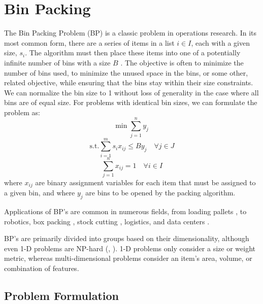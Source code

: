 \documentclass[12pt]{article}
\begin{document}
\section{Bin Packing}

The Bin Packing Problem (BP) is a classic problem in operations research. 
In its most common form, there are a series of items in a list $i \in I$, each with a given size, $s_i$.
The algorithm must then place these items into one of a potentially infinite number of bins with a size $B$ \citep{Coffman2013}. 
The objective is often to minimize the number of bins used, to minimize the unused space in the bins, or some other, related objective, while ensuring that the bins stay within their size constraints.
We can normalize the bin size to 1 without loss of generality in the case where all bins are of equal size.
For problems with identical bin sizes, we can formulate the problem as:
%
\begin{equation}
    \textrm{min} \; \sum_{j=1}^n y_j
\label{eq:bin_packing_count_obj}
\end{equation}
%
\begin{equation}
    \textrm{s.t.} \sum_{i=1}^m s_i x_{ij}\leq By_j \quad \forall j \in J
\end{equation}
%
\begin{equation}
    \sum_{j=1}^n x_{ij} = 1 \quad \forall i \in I
\end{equation}
%
where $x_{ij}$ are binary assignment variables for each item that must be assigned to a given bin, and where $y_j$ are bins to be opened by the packing algorithm.

Applications of BP's are common in numerous fields, from loading pallets \citep{Ram1992}, to robotics, box packing \citep{Courcoubetis1990}, stock cutting \citep{Gilmore1961}, logistics, and data centers \citep{Song2014}.

BP's are primarily divided into groups based on their dimensionality, although even 1-D problems are NP-hard (\citet{Christensen2017}, \citet{Johnson1974}). 
1-D problems only consider a size or weight metric, whereas multi-dimensional problems consider an item's area, volume, or combination of features. 

\subsection{Problem Formulation}
\end{document}
